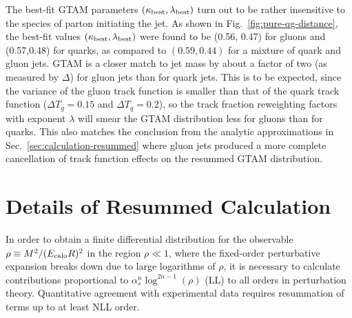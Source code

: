 \documentclass[letterpaper,11pt]{article}
\newcommand{\Fig}[1]{Fig.~\ref{#1}}
\newcommand{\Sec}[1]{Sec.~\ref{#1}}
\begin{document}
The best-fit GTAM parameters $(\kappa_{\rm best},\lambda_{\rm best})$ turn out to be rather insensitive to the species of parton initiating the jet. 
%
As shown in \Fig{fig:pure-qg-distance}, the best-fit values $(\kappa_{\rm best},\lambda_{\rm best})$ were found to be (0.56, 0.47) for gluons and (0.57,0.48) for quarks, as compared to $(0.59,0.44)$ for a mixture of quark and gluon jets. 
%
GTAM is a closer match to jet mass by about a factor of two (as measured by $\Delta$) for gluon jets than for quark jets. 
%
This is to be expected, since the variance of the gluon track function is smaller than that of the quark track function ($\Delta T_g = 0.15$ and $\Delta T_q = 0.2$), so the track fraction reweighting factors with exponent $\lambda$ will smear the GTAM distribution less for gluons than for quarks. 
%
This also matches the conclusion from the analytic approximations in \Sec{sec:calculation-resummed} where gluon jets produced a more complete cancellation of track function effects on the resummed GTAM distribution. 





























\section{Details of Resummed Calculation}
\label{app:details-resummed}


In order to obtain a finite differential distribution for the observable $\rho \equiv M^2/(E_{\rm calo}R)^2$ in the region $\rho \ll 1$, where the fixed-order perturbative expansion breaks down due to large logarithms of $\rho$, it is necessary to calculate contributions proportional to $\alpha_s^n \log^{2n-1}(\rho)$ (LL) to all orders in perturbation theory. 
%
Quantitative agreement with experimental data requires resummation of terms up to at least NLL order. 
\end{document}
